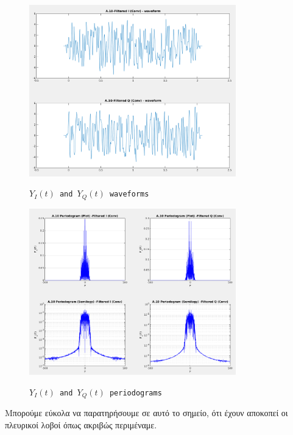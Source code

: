 \documentclass[11pt]{article}
\begin{document}
    \begin{figure}[H]
        \centering
        \includegraphics[scale=0.5, width=0.8\textwidth]{img/A10_filt_wave.png} \\
        \caption{\texttt{$Y_I(t)$ and $Y_Q(t)$ waveforms}}
    \end{figure}
    
    \begin{figure}[H]
        \centering
        \includegraphics[scale=0.5, width=0.8\textwidth]{img/A10_filt_period.png} \\
        \caption{\texttt{$Y_I(t)$ and $Y_Q(t)$ periodograms}}
    \end{figure}
    
    \par \noindent
    Μπορούμε εύκολα να παρατηρήσουμε σε αυτό το σημείο, ότι έχουν αποκοπεί οι πλευρικοί λοβοί όπως ακριβώς περιμέναμε.
    
\end{document}

